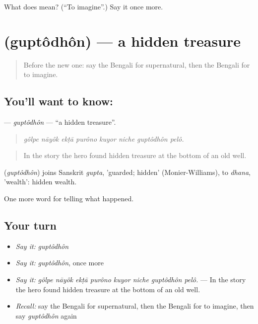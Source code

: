 \begin{tcolorbox}[breakable,colback=teal!4,colframe=teal!35!black,title={Before you move on}]
What does   mean? (\textquotedblleft{}To imagine\textquotedblright{}.) Say it once more.
\end{tcolorbox}
\section[\texorpdfstring{\bn{গুপ্তধন} (guptôdhôn)}{গুপ্তধন (guptôdhôn)}]{ (guptôdhôn) — a hidden treasure}

\label{lesson:BN-C326-guptodhon}



\begin{quote}
Before the new one: say the Bengali for supernatural, then the Bengali for to imagine.
\end{quote}

\subsection*{You'll want to know: }
\textbf{} — \emph{guptôdhôn} — \textquotedblleft{}a hidden treasure\textquotedblright{}.

\begin{quote}
       
\end{quote}

\begin{quote}
\emph{gôlpe nāyôk ekṭā purôno kuyor niche guptôdhôn pelô.}
\end{quote}

\begin{quote}
In the story the hero found hidden treasure at the bottom of an old well.
\end{quote}

\begin{cousinweb}
\textbf{} (\emph{guptôdhôn}) joins Sanskrit \emph{gupta}, 'guarded; hidden' (Monier-Williams), to \emph{dhana}, 'wealth': hidden wealth.
\end{cousinweb}

\begin{grammarlens}[title={What you've built}]
One more word for telling what happened.
\end{grammarlens}

\subsection*{Your turn}
\begin{itemize}
\raggedright
  \item \emph{Say it:} \emph{guptôdhôn}
  \item \emph{Say it:} \emph{guptôdhôn}, once more
  \item \emph{Say it:} \emph{gôlpe nāyôk ekṭā purôno kuyor niche guptôdhôn pelô.} — In the story the hero found hidden treasure at the bottom of an old well.
  \item \emph{Recall:} say the Bengali for supernatural, then the Bengali for to imagine, then say \emph{guptôdhôn} again
\end{itemize}


